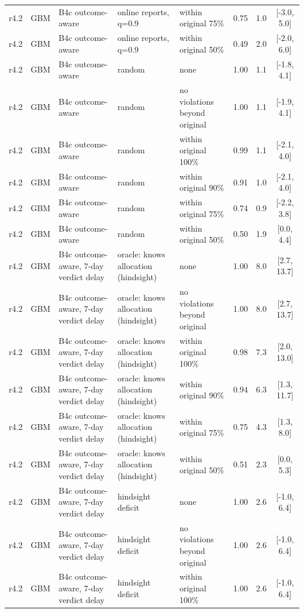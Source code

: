 \begin{longtable}{lllp{4.2cm}p{3.4cm}ccc}
r4.2 & GBM & B4c outcome-aware & online reports, q=0.9 & within original 75\% & 0.75 & 1.0 & [-3.0, 5.0] \\
r4.2 & GBM & B4c outcome-aware & online reports, q=0.9 & within original 50\% & 0.49 & 2.0 & [-2.0, 6.0] \\
r4.2 & GBM & B4c outcome-aware & random & none & 1.00 & 1.1 & [-1.8, 4.1] \\
r4.2 & GBM & B4c outcome-aware & random & no violations beyond original & 1.00 & 1.1 & [-1.9, 4.1] \\
r4.2 & GBM & B4c outcome-aware & random & within original 100\% & 0.99 & 1.1 & [-2.1, 4.0] \\
r4.2 & GBM & B4c outcome-aware & random & within original 90\% & 0.91 & 1.0 & [-2.1, 4.0] \\
r4.2 & GBM & B4c outcome-aware & random & within original 75\% & 0.74 & 0.9 & [-2.2, 3.8] \\
r4.2 & GBM & B4c outcome-aware & random & within original 50\% & 0.50 & 1.9 & [0.0, 4.4] \\
r4.2 & GBM & B4c outcome-aware, 7-day verdict delay & oracle: knows allocation (hindsight) & none & 1.00 & 8.0 & [2.7, 13.7] \\
r4.2 & GBM & B4c outcome-aware, 7-day verdict delay & oracle: knows allocation (hindsight) & no violations beyond original & 1.00 & 8.0 & [2.7, 13.7] \\
r4.2 & GBM & B4c outcome-aware, 7-day verdict delay & oracle: knows allocation (hindsight) & within original 100\% & 0.98 & 7.3 & [2.0, 13.0] \\
r4.2 & GBM & B4c outcome-aware, 7-day verdict delay & oracle: knows allocation (hindsight) & within original 90\% & 0.94 & 6.3 & [1.3, 11.7] \\
r4.2 & GBM & B4c outcome-aware, 7-day verdict delay & oracle: knows allocation (hindsight) & within original 75\% & 0.75 & 4.3 & [1.3, 8.0] \\
r4.2 & GBM & B4c outcome-aware, 7-day verdict delay & oracle: knows allocation (hindsight) & within original 50\% & 0.51 & 2.3 & [0.0, 5.3] \\
r4.2 & GBM & B4c outcome-aware, 7-day verdict delay & hindsight deficit & none & 1.00 & 2.6 & [-1.0, 6.4] \\
r4.2 & GBM & B4c outcome-aware, 7-day verdict delay & hindsight deficit & no violations beyond original & 1.00 & 2.6 & [-1.0, 6.4] \\
r4.2 & GBM & B4c outcome-aware, 7-day verdict delay & hindsight deficit & within original 100\% & 1.00 & 2.6 & [-1.0, 6.4] \\

\end{longtable}
